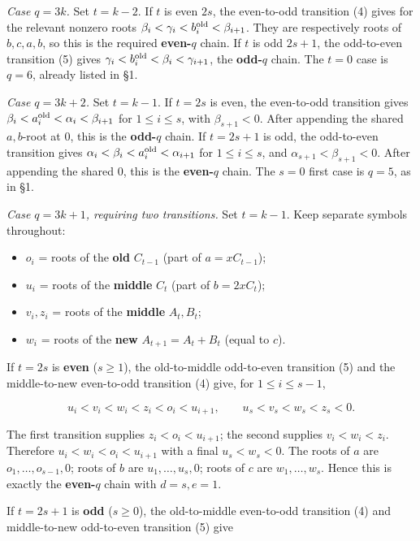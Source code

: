 \documentclass[
  10pt,
]{article}
\providecommand{\tightlist}{%
  \setlength{\itemsep}{0pt}\setlength{\parskip}{0pt}}
\begin{document}
\emph{Case \(q=3k\).} Set \(t=k-2\). If \(t\) is even \(2s\), the
even-to-odd transition (4) gives for the relevant nonzero roots
\(\beta_i<\gamma_i<b_i^{\rm old}<\beta_{i+1}\). They are respectively
roots of \(b,c,a,b\), so this is the required \textbf{even-\(q\)} chain.
If \(t\) is odd \(2s+1\), the odd-to-even transition (5) gives
\(\gamma_i<b_i^{\rm old}<\beta_i<\gamma_{i+1}\), the \textbf{odd-\(q\)}
chain. The \(t=0\) case is \(q=6\), already listed in §1.

\emph{Case \(q=3k+2\).} Set \(t=k-1\). If \(t=2s\) is even, the
even-to-odd transition gives
\(\beta_i<a_i^{\rm old}<\alpha_i<\beta_{i+1}\) for \(1\le i\le s\), with
\(\beta_{s+1}<0\). After appending the shared \(a,b\)-root at \(0\),
this is the \textbf{odd-\(q\)} chain. If \(t=2s+1\) is odd, the
odd-to-even transition gives
\(\alpha_i<\beta_i<a_i^{\rm old}<\alpha_{i+1}\) for \(1\le i\le s\), and
\(\alpha_{s+1}<\beta_{s+1}<0\). After appending the shared \(0\), this
is the \textbf{even-\(q\)} chain. The \(s=0\) first case is \(q=5\), as
in §1.

\emph{Case \(q=3k+1\), requiring two transitions.} Set \(t=k-1\). Keep
separate symbols throughout:

\begin{itemize}
\tightlist
\item
  \(o_i\) = roots of the \textbf{old} \(C_{t-1}\) (part of
  \(a=xC_{t-1}\));
\item
  \(u_i\) = roots of the \textbf{middle} \(C_t\) (part of \(b=2xC_t\));
\item
  \(v_i,z_i\) = roots of the \textbf{middle} \(A_t,B_t\);
\item
  \(w_i\) = roots of the \textbf{new} \(A_{t+1}=A_t+B_t\) (equal to
  \(c\)).
\end{itemize}

If \(t=2s\) is \textbf{even} (\(s\ge1\)), the old-to-middle odd-to-even
transition (5) and the middle-to-new even-to-odd transition (4) give,
for \(1\le i\le s-1\),

\[
 u_i<v_i<w_i<z_i<o_i<u_{i+1},\qquad u_s<v_s<w_s<z_s<0.
 \tag{6}
\]

The first transition supplies \(z_i<o_i<u_{i+1}\); the second supplies
\(v_i<w_i<z_i\). Therefore \(u_i<w_i<o_i<u_{i+1}\) with a final
\(u_s<w_s<0\). The roots of \(a\) are \(o_1,\ldots,o_{s-1},0\); roots of
\(b\) are \(u_1,\ldots,u_s,0\); roots of \(c\) are \(w_1,\ldots,w_s\).
Hence this is exactly the \textbf{even-\(q\)} chain with \(d=s,e=1\).

If \(t=2s+1\) is \textbf{odd} (\(s\ge0\)), the old-to-middle even-to-odd
transition (4) and middle-to-new odd-to-even transition (5) give
\end{document}
